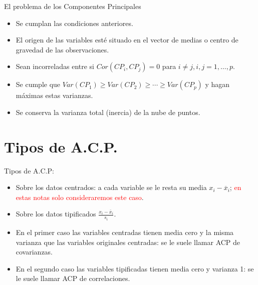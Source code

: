 \documentclass[
  ignorenonframetext,
]{beamer}
\providecommand{\tightlist}{%
  \setlength{\itemsep}{0pt}\setlength{\parskip}{0pt}}
\newcommand\red[1]{\textcolor{red}{#1}}
\begin{document}
\begin{frame}{El problema de los Componentes Principales}
\label{el-problema-de-los-componentes-principales-2}
\begin{itemize}
\tightlist
\item
  Se cumplan las condiciones anteriores.
\item
  El origen de las variables esté situado en el vector de medias o
  centro de gravedad de las observaciones.
\item
  Sean incorreladas entre si \(Cor(CP_i,CP_j)=0\) para \(i\not= j, i,j
  =1,\ldots,p\).
\item
  Se cumple que \(Var(CP_1)\geq Var(CP_2)\geq\cdots\geq Var(CP_p)\) y
  hagan máximas estas varianzas.
\item
  Se conserva la varianza total (inercia) de la nube de puntos.
\end{itemize}
\end{frame}

\section{Tipos de A.C.P.}\label{tipos-de-a.c.p.}

\begin{frame}{Tipos de A.C.P:}
\label{tipos-de-a.c.p}
\begin{itemize}
\tightlist
\item
  Sobre los datos centrados: a cada variable se le resta su media
  \(x_i-\overline{x}_i\);
  \red{en estas notas solo consideraremos este caso}.
\item
  Sobre los datos tipificados \(\frac{x_{i}-\overline{x}_i}{s_i}\).
\item
  En el primer caso las variables centradas tienen media cero y la misma
  varianza que las variables originales centradas: se le suele llamar
  ACP de covarianzas.
\item
  En el segundo caso las variables tipificadas tienen media cero y
  varianza 1: se le suele llamar ACP de correlaciones.
\end{itemize}
\end{frame}
\end{document}
